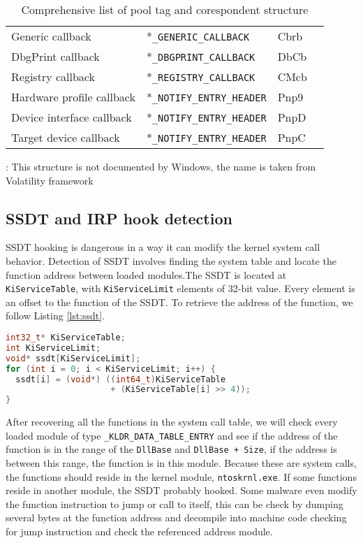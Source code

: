 \begin{table}[]
\begin{tabular}{llll}
  Generic callback          & *\texttt{\_GENERIC\_CALLBACK}      & Cbrb           &                       \\
  DbgPrint callback         & *\texttt{\_DBGPRINT\_CALLBACK}     & DbCb           &                       \\
  Registry callback         & *\texttt{\_REGISTRY\_CALLBACK}     & CMcb           &                       \\
  Hardware profile callback & *\texttt{\_NOTIFY\_ENTRY\_HEADER}  & Pnp9           &                       \\
  Device interface callback & *\texttt{\_NOTIFY\_ENTRY\_HEADER}  & PnpD           &                       \\
  Target device callback    & *\texttt{\_NOTIFY\_ENTRY\_HEADER}  & PnpC           &                       \\
\hline
\end{tabular}
  {\raggedright *: This structure is not documented by Windows, the name is taken
  from Volatility framework \par}
  \caption{Comprehensive list of pool tag and corespondent structure}
  \label{tab:pooltag}
\end{table}

\subsection[SSDT and IRP hook detection]{SSDT and IRP hook detection}

SSDT hooking is dangerous in a way it can modify the kernel system call
behavior.  Detection of SSDT involves finding the system table and locate the
function address between loaded modules.The SSDT is located at
\texttt{KiServiceTable}, with \texttt{KiServiceLimit} elements of 32-bit value.
Every element is an offset to the function of the SSDT. To retrieve the address
of the function, we follow Listing \ref{lst:ssdt}.


\begin{lstlisting}[language=cpp,caption={Retrieve SSDT functions},label={lst:ssdt},float,floatplacement=H]
int32_t* KiServiceTable;
int KiServiceLimit;
void* ssdt[KiServiceLimit];
for (int i = 0; i < KiServiceLimit; i++) {
  ssdt[i] = (void*) ((int64_t)KiServiceTable
                     + (KiServiceTable[i] >> 4));
}
\end{lstlisting}

After recovering all the functions in the system call table, we will check
every loaded module of type \texttt{\_KLDR\_DATA\_TABLE\_ENTRY} and see if the
address of the function is in the range of the \texttt{DllBase} and
\texttt{DllBase + Size}, if the address is between this range, the function is
in this module.  Because these are system calls, the functions should reside in
the kernel module, \texttt{ntoskrnl.exe}. If some functions reside in another
module, the SSDT probably hooked. Some malware even modify the function
instruction to jump or call to itself, this can be check by dumping several
bytes at the function address and decompile into machine code checking for jump
instruction and check the referenced address module.


